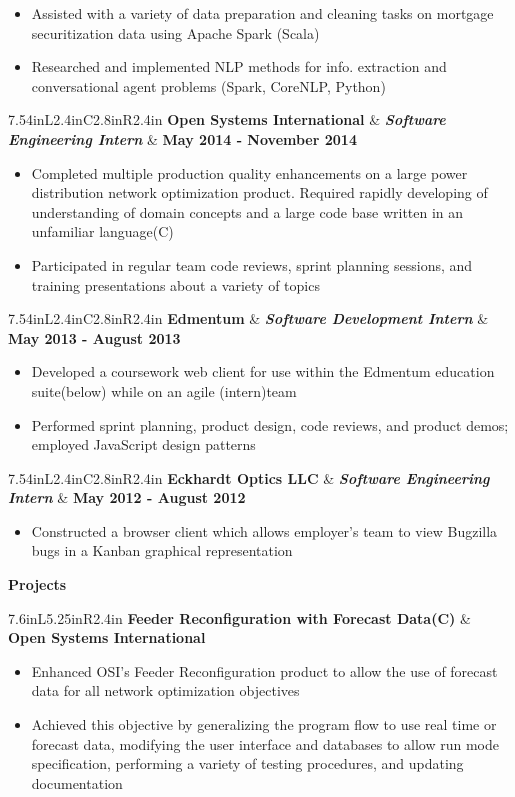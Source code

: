 \documentclass[letterpaper,10pt]{article}
\newcommand{\resitem}[1]{\item #1 

\vspace{-.1in}
}
\newcommand{\resheading}[1]{
	{
		\large\colorbox{mygrey}
		{
			\begin{minipage}{.98\textwidth}

			\centerline{\textbf{#1 \vphantom{p\^{E}}}}
			\end{minipage}
		}
	}
}
\newcommand{\ressubheadingg}[2]{
	\begin{tabular*}{7.6in}{L{5.25in}R{2.4in}}
			\textbf{#1} & \textbf{#2}
	\end{tabular*}
}
\newcommand{\rressubheading}[3]{
	\begin{tabular*}{7.54in}{L{2.4in}C{2.8in}R{2.4in}}
			\textbf{#1} & \textit{\textbf{#2}}  & \textbf{#3}
	\end{tabular*}
}
\begin{document}
			\vspace{-.1in}
			\begin{itemize}
				\resitem{Assisted with a variety of data preparation and cleaning tasks on mortgage securitization data using Apache Spark (Scala)}
				\resitem{Researched and implemented NLP methods for info. extraction and conversational agent problems (Spark, CoreNLP, Python)}
			\end{itemize}
			\vspace{.1in}
		\rressubheading{Open Systems International}{Software Engineering Intern}{May 2014 - November 2014}
			\vspace{-.1in}
			\begin{itemize}
				\resitem{Completed multiple production quality enhancements on a large power distribution network optimization product. Required rapidly developing of understanding of domain concepts and a large code base written in an unfamiliar language(C)}
				\resitem{Participated in regular team code reviews, sprint planning sessions, and training presentations about a variety of topics}
			\end{itemize}
			\vspace{.1in}
		\rressubheading{Edmentum}{Software Development Intern}{May 2013 - August 2013}
			\vspace{-.1in}
			\begin{itemize}
				\resitem{Developed a coursework web client for use within the Edmentum education suite(below) while on an agile (intern)team}
				\resitem{Performed sprint planning, product design, code reviews, and product demos; employed JavaScript design patterns}
			\end{itemize}
			\vspace{.1in}
			\rressubheading{Eckhardt Optics LLC}{Software Engineering Intern}{May 2012 - August 2012}
			\vspace{-.1in}
			\begin{itemize}
				\resitem{Constructed a browser client which allows employer's team to view Bugzilla bugs in a Kanban graphical representation}
			\end{itemize}
			\vspace{.1in}
	\resheading{Projects}
		\ressubheadingg{Feeder Reconfiguration with Forecast Data(C)}{Open Systems International}
			\vspace{-.25in}
			\begin{itemize}
				\resitem{Enhanced OSI's Feeder Reconfiguration product to allow the use of forecast data for all network optimization objectives}
				\resitem{Achieved this objective by generalizing the program flow to use real time or forecast data, modifying the user interface and databases to allow run mode specification, performing a variety of testing procedures, and updating documentation}
			\end{itemize}
\end{document}
